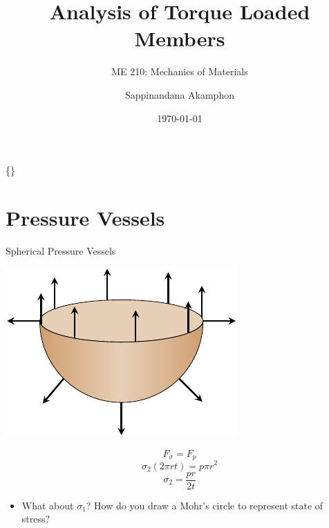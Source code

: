 \documentclass[10pt, svgnames]{beamer}
\author{Sappinandana Akamphon}
\date{\today}
\title{Analysis of Torque Loaded Members}
\subtitle{ME 210: Mechanics of Materials}
\institute{Department of Mechanical Engineering, TSE}
\date{}
\begin{document}
\begin{frame}[label={sec:orgfe4ca94}]{\{\}}
\maketitle
\end{frame}

\section{Pressure Vessels}
\label{sec:org4e70d7c}

\begin{frame}[label={sec:org1f51ea7}]{Spherical Pressure Vessels}
\begin{center}
\includegraphics[width=.9\linewidth]{pictures/sphere-pressure-vessel.pdf}
\end{center}

$$ F_{\sigma} = F_p $$
$$ \sigma_2 \left( 2\pi r t \right) = p \pi r^2 $$
$$ \sigma_2 = \frac{pr}{2t} $$

\begin{itemize}
\item What about \(\sigma_1\)? How do you draw a Mohr's circle to represent state of stress?
\end{itemize}
\end{frame}
\end{document}
